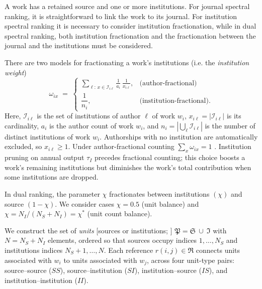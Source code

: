 A work has a retained source and one or more institutions. For journal spectral ranking, it is straightforward to link the work to its journal. For institution spectral ranking it is necessary to consider institution fractionation, while in dual spectral ranking, both institution fractionation and the fractionation between the journal and the institutions must be considered. 

There are two models for fractionating a work's institutions (i.e. the \textit{institution weight})
\begin{equation}
  \omega_{ix} \;=\;
  \begin{cases}
  \displaystyle\sum_{\ell:\,x\in\mathcal{I}_{i\ell}}
  \frac{1}{a_i}\,\frac{1}{x_{i\ell}}, & \text{(author-fractional)} \\[10pt]
  \dfrac{1}{n_i}, & \text{(institution-fractional).}
  \end{cases}
  \label{eq:omega}
\end{equation}
Here, $\mathcal{I}_{i\ell}$ is the set of institutions of author $\ell$ of work $w_i$, $x_{i\ell}=|\mathcal{I}_{i\ell}|$ is its cardinality, $a_i$ is the author count of work $w_i$, and $n_i = |\bigcup_\ell \mathcal{I}_{i\ell}|$ is the number of distinct institutions of work $w_i$. Authorships with no institution are automatically excluded, so $x_{i\ell}\ge 1$. Under author-fractional counting $\sum_x\omega_{ix}=1$ \citep{waltmanFieldnormalizedCitationImpact2015}. Institution pruning on annual output $\tau_I$ precedes fractional counting; this choice boosts a work's remaining institutions but diminishes the work's total contribution when some institutions are dropped.

In dual ranking, the parameter $\chi$ fractionates between institutions $(\chi)$ and source $(1-\chi)$. We consider cases $\chi = 0.5$ (unit balance) and $\chi=N_I/(N_S+N_I) = \chi^*$ (unit count balance).

We construct the set of \emph{units} [sources or institutions;
\cite{pinskiCitationInfluenceJournal1976}]
$\mathfrak{P}=\mathfrak{S}\ \cup\ \mathfrak{I}$ with $N=N_S+N_I$ elements,
ordered so that sources occupy indices $1,\dots,N_S$ and institutions
indices $N_S+1,\dots,N$. Each reference $r(i,j) \in \mathfrak{R}$ connects units
associated with $w_i$ to units associated with $w_j$,
across four unit-type pairs: source--source ($SS$), source--institution
($SI$), institution--source ($IS$), and institution--institution ($II$).

